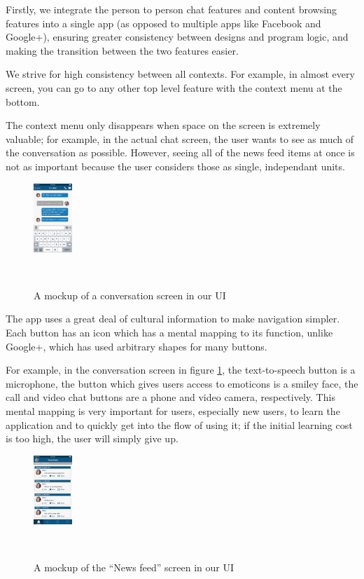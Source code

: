\documentclass{sigchi}
\begin{document}
Firstly, we integrate the person to person chat features and content browsing
features into a single app (as opposed to multiple apps like Facebook and
Google+), ensuring greater consistency between designs and program logic, and
making the transition between the two features easier.

We strive for high consistency between all contexts. For example, in
almost every screen, you can go to any other top level feature with the context
menu at the bottom.

The context menu only disappears when space on the screen is
extremely valuable; for example, in the actual chat screen, the user wants to
see as much of the conversation as possible. However, seeing all of the news
feed items at once is not as important because the user considers those as
single, independant units. 

\begin{figure}
  \vspace{-14pt}
  \centering\includegraphics[width=0.13\textwidth]{figures/Regular-convo_02}
  \caption{A mockup of a conversation screen in our UI}~\label{fig:UIconvo}
\end{figure}

The app uses a great deal of cultural information to make navigation simpler.
Each button has an icon which has a mental mapping to its function, unlike
Google+, which has used arbitrary shapes for many buttons. 

For example, in the conversation screen in figure \ref{fig:UIconvo}, the
text-to-speech button is a microphone, the button which gives users access to
emoticons is a smiley face, the call and video chat buttons are a phone and
video camera, respectively. This mental mapping is very important for users,
especially new users, to learn the application and to quickly get into the flow
of using it; if the initial learning cost is too high, the user will simply give
up.

\begin{figure}
  \centering\includegraphics[width=0.13\textwidth]{figures/NewsFeed_EDIT}
  \caption{A mockup of the ``News feed'' screen in our UI}~\label{fig:UInewsfeed}
\end{figure}
\end{document}
